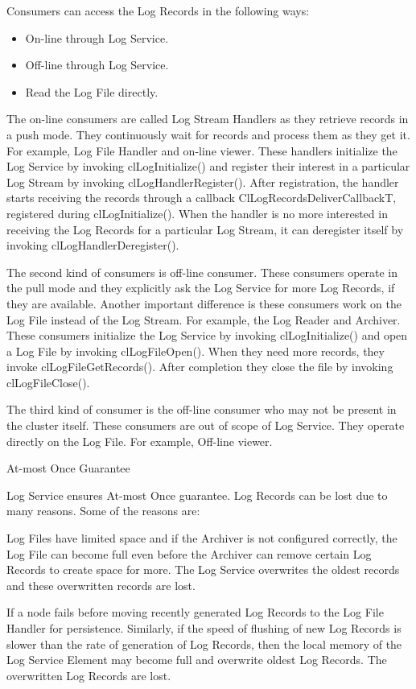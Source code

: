 \begin{flushleft}
Consumers can access the Log Records in the following ways:
\begin{itemize}
\item
On-line through Log Service.
\item
Off-line through Log Service.
\item
Read the Log File directly.
\end{itemize}


The on-line consumers are called Log Stream Handlers as they retrieve records in a push mode. They continuously wait for records and process them as 
they get it. For example, Log File Handler and on-line viewer. These handlers initialize the Log Service by invoking clLogInitialize() and register 
their interest in a particular Log Stream by invoking clLogHandlerRegister(). After registration, the handler starts receiving the records through a 
callback ClLogRecordsDeliverCallbackT, registered during clLogInitialize(). When the handler is no more interested in receiving the Log Records for a 
particular Log Stream, it can deregister itself by invoking clLogHandlerDeregister().
\par
The second kind of consumers is off-line consumer. These consumers operate in the pull mode and they explicitly ask the Log Service for more Log Records,
if they are available. Another important difference is these consumers work on the Log File instead of the Log Stream. For example, the Log Reader and
Archiver. These consumers initialize the Log Service by invoking clLogInitialize() and open a Log File by invoking clLogFileOpen(). When they need more 
records, they invoke clLogFileGetRecords(). After completion they close the file by invoking clLogFileClose().
\par
The third kind of consumer is the off-line consumer who may not be present in the cluster itself. These consumers are out of scope of Log Service. 
They operate directly on the Log File. For example, Off-line viewer. 

\begin{Desc}
\item[At-most Once Guarantee]
\end{Desc}
Log Service ensures At-most Once guarantee. Log Records can be lost due to many reasons. Some of the reasons are: \par
Log Files have limited space and if the Archiver is not configured correctly, the Log File can become full even before the Archiver can remove certain
Log Records to create space for more. The Log Service overwrites the oldest records and these overwritten records are lost. 
\par
If a node fails before moving recently generated Log Records to the Log File Handler for persistence. Similarly, if the speed of flushing of new Log 
Records is slower than the rate of generation of Log Records, then the local memory of the Log Service Element may become full and overwrite oldest Log 
Records. The overwritten Log Records are lost.



\end{flushleft}
